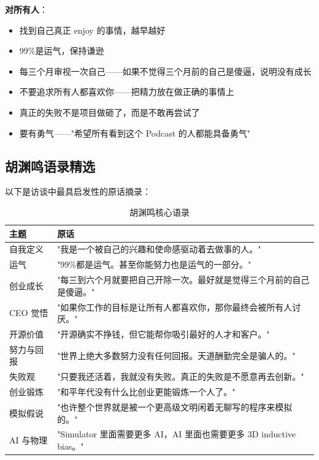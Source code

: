\textbf{对所有人}：
\begin{itemize}
\item 找到自己真正 enjoy 的事情，越早越好
\item 99\%是运气，保持谦逊
\item 每三个月审视一次自己——如果不觉得三个月前的自己是傻逼，说明没有成长
\item 不要追求所有人都喜欢你——把精力放在做正确的事情上
\item 真正的失败不是项目做砸了，而是不敢再尝试了
\item 要有勇气——"希望所有看到这个 Podcast 的人都能具备勇气"
\end{itemize}

\subsection{胡渊鸣语录精选}

以下是访谈中最具启发性的原话摘录：

\begin{table}[H]
\centering
\caption{胡渊鸣核心语录}
\begin{tabular}{p{3.5cm}p{10cm}}
\toprule
\textbf{主题} & \textbf{原话} \\
\midrule
自我定义 & "我是一个被自己的兴趣和使命感驱动着去做事的人。" \\
\midrule
运气 & "99\%都是运气。甚至你能努力也是运气的一部分。" \\
\midrule
创业成长 & "每三到六个月就要把自己开除一次。最好就是觉得三个月前的自己是傻逼。" \\
\midrule
CEO 觉悟 & "如果你工作的目标是让所有人都喜欢你，那你最终会被所有人讨厌。" \\
\midrule
开源价值 & "开源确实不挣钱，但它能帮你吸引最好的人才和客户。" \\
\midrule
努力与回报 & "世界上绝大多数努力没有任何回报。天道酬勤完全是骗人的。" \\
\midrule
失败观 & "只要我还活着，我就没有失败。真正的失败是不愿意再去创新。" \\
\midrule
创业锻炼 & "和平年代没有什么比创业更能锻炼一个人了。" \\
\midrule
模拟假说 & "也许整个世界就是被一个更高级文明闲着无聊写的程序来模拟的。" \\
\midrule
AI 与物理 & "Simulator 里面需要更多 AI，AI 里面也需要更多 3D inductive bias。" \\
\bottomrule
\end{tabular}
\end{table}

